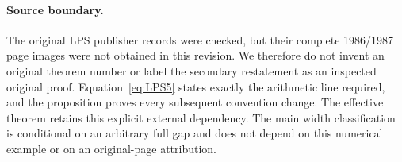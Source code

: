 \paragraph{Source boundary.}
The original LPS publisher records were checked, but their complete
1986/1987 page images were not obtained in this revision. We therefore
do not invent an original theorem number or label the secondary
restatement as an inspected original proof. Equation~\eqref{eq:LPS5}
states exactly the arithmetic line required, and the proposition
proves every subsequent convention change. The effective theorem
retains this explicit external dependency. The main width
classification is conditional on an arbitrary full gap and does not
depend on this numerical example or on an original-page attribution.
